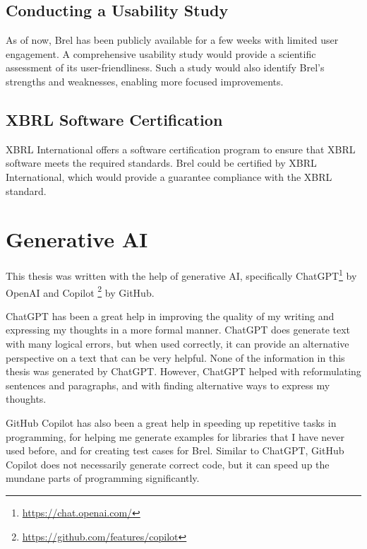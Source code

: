 \subsection{Conducting a Usability Study}

As of now, Brel has been publicly available for a few weeks with limited user engagement.
A \textcolor{airforceblue}{comprehensive usability study} would provide a scientific assessment of its user-friendliness.
Such a study would also identify Brel's strengths and weaknesses, enabling more focused improvements.

\subsection{XBRL Software Certification}

XBRL International offers a software certification program to ensure that XBRL software meets the required standards\cite{xbrl_certified_software}.
Brel could be 
\textcolor{airforceblue}{certified by XBRL International}, which would provide a guarantee compliance with the XBRL standard.


\section{Generative AI}

This thesis was written with the help of generative AI, specifically ChatGPT\footnote{\url{https://chat.openai.com/}} by OpenAI and Copilot \footnote{\url{https://github.com/features/copilot}} by GitHub.

ChatGPT has been a great help in improving the quality of my writing and expressing my thoughts in a more formal manner.
ChatGPT does generate text with many logical errors, but when used correctly, it can provide an alternative perspective on a text that can be very helpful.
None of the information in this thesis was generated by ChatGPT.
However, ChatGPT helped with reformulating sentences and paragraphs, and with finding alternative ways to express my thoughts.

GitHub Copilot has also been a great help in speeding up repetitive tasks in programming,
for helping me generate examples for libraries that I have never used before,
and for creating test cases for Brel.
Similar to ChatGPT, GitHub Copilot does not necessarily generate correct code,
but it can speed up the mundane parts of programming significantly.

